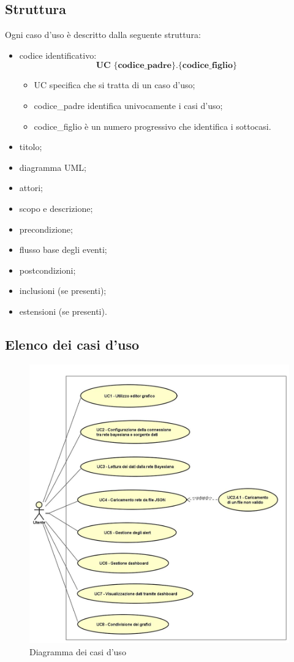 \subsection{Struttura}
Ogni caso d'uso è descritto dalla seguente struttura:
\begin{itemize}
	\item codice identificativo: $$ \textbf{UC \{codice\_padre\}.\{codice\_figlio\}  } $$
	\begin{itemize}
		\item UC specifica che si tratta di un caso d'uso;
		\item codice\_padre identifica univocamente i casi d'uso;
		\item codice\_figlio è un numero progressivo che identifica i sottocasi.
	\end{itemize}
	\item titolo;
	\item diagramma UML;
	\item attori;
	\item scopo e descrizione;
	\item precondizione;
	\item flusso base degli eventi;
	\item postcondizioni;
	\item inclusioni (se presenti);
	\item estensioni (se presenti).
\end{itemize}

\newpage
\subsection{Elenco dei casi d'uso}
\begin{figure} [H]
	\centering
	\includegraphics[scale=0.5]{Img/UC}
	\caption{Diagramma dei casi d'uso}\label{}
\end{figure}

